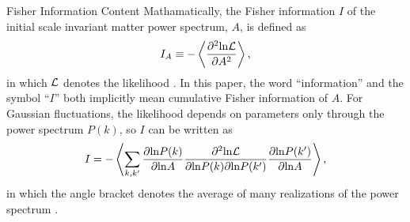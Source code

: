 \begin{section}{Fisher Information Content}
  \label{sec:fisherinfo}
  Mathamatically, the Fisher information $I$ of the initial scale
  invariant matter power spectrum, $A$, is defined as
  \begin{align}
    I_A \equiv -\left\langle \frac{\partial ^2 \mathrm{ln \mathcal{L}}}{\partial A ^2}\right\rangle,
    \label{eq:fisherdefine}
  \end{align}
  in which $\mathcal{L}$ denotes the likelihood \cite{bib:Tegmark1997}.  
  In this paper, the word \enquote{information} and the symbol \enquote{$I$} both implicitly 
  mean cumulative Fisher information 
  of $A$. For Gaussian
  fluctuations, the likelihood depends on parameters only through the
  power spectrum $P(k)$, so $I$ can be written as 
  \begin{align}
    I = - \left\langle \sum_{k,k'} \frac{\partial \mathrm{ln} P(k)}{\partial \mathrm{ln} A} 
    \frac{\partial ^2 \mathrm{ln \mathcal{L}}}{\partial \mathrm{ln} P(k) \partial \mathrm{ln} P(k')}
    \frac{\partial \mathrm{ln} P(k')}{\partial \mathrm{ln} A}\right\rangle,
    \label{eq:fisherdef2}
  \end{align}
  in which the angle bracket denotes the average of many realizations
  of the power spectrum \cite{bib:Rimes2006}.


\end{section}
